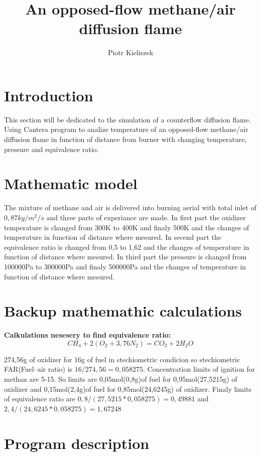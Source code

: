 \documentclass[a4paper]{article}
\title{An opposed-flow methane/air diffusion flame}
\author{Piotr Kieliszek}
\begin{document}
\maketitle



\section{Introduction}

This section will be dedicated to the simulation of a counterflow diffusion flame. Using Cantera program to analize temperature of an opposed-flow methane/air diffusion flame in function of distance from burner with changing temperature, pressure and equivalence ratio.


\section{Mathematic model}

The mixture of methane and air is delivered into burning aerial with total inlet of $0,87kg/m^2/s$ and three parts of experiance are made. In first part the oxidizer temperature is changed from 300K to 400K and finaly 500K and the changes of temperature in function of distance where mesured. In secend part the equivalence ratio is changed from 0,5 to 1,62 and the changes of temperature in function of distance where mesured. In third part the pressure is changed from 100000Pa to 300000Pa and finaly 500000Pa and the changes of temperature in function of distance where mesured.

\section{Backup mathemathic calculations}
\textbf{Calkulations nesesery to find equivalence ratio:}
\[{CH_4 +2(O_2+3,76N_2) }
      = {CO_2+2H_2 O}\] 

274,56g of oxidizer for 16g of fuel in stechiometric condicion so stechiometric FAR(Fuel–air ratio) is $16/274,56=0,058275$. Concentration limits of ignition for methan are 5-15. So limits are 0,05mol(0,8g)of fuel for 0,95mol(27,5215g) of oxidizer and 0,15mol(2,4g)of fuel for 0,85mol(24,6245g) of oxidizer. Finaly limits of equivalence ratio are $0,8/(27,5215*0,058275)=0,49881$ and $2,4/(24,6245*0,058275)=1,67248$

\section{Program description}
\end{document}
